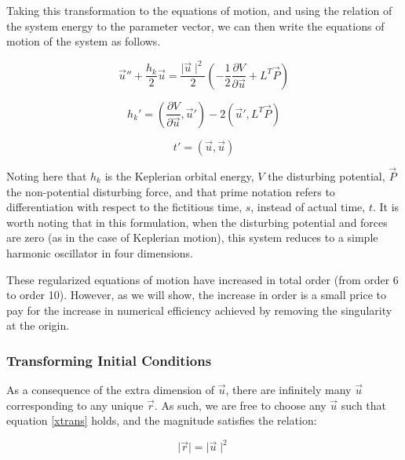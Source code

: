 \documentclass[11pt,twoside,letterpaper]{article}
\begin{document}
  Taking this transformation to the equations of motion, and using the
  relation of the system energy to the parameter vector, we can then
  write the equations of motion of the system as follows.

  \begin{equation} \label{eom}
    \vec{u}'' + \frac{h_k}{2}\vec{u} = \frac{\mid\vec{u}\mid^2}{2}
    \left(-\frac{1}{2}\frac{\partial{V}}{\partial{\vec{u}}} + L^T\vec{P}\right)
  \end{equation}

  \begin{equation} \label{energy_eom}
    h_k' = \left(\frac{\partial{V}}{\partial{\vec{u}}}, \vec{u}'\right)
    - 2\left(\vec{u}',L^T\vec{P}\right)
  \end{equation}

  \begin{equation} \label{time_eom}
    t' = \left(\vec{u}, \vec{u}\right)
  \end{equation}

  Noting here that \(h_k\) is the Keplerian orbital energy, \(V\) the
  disturbing potential, \(\vec{P}\) the non-potential disturbing
  force, and that prime notation refers to differentiation with
  respect to the fictitious time, \(s\), instead of actual time,
  \(t\). It is worth noting that in this formulation, when the
  disturbing potential and forces are zero (as in the case of
  Keplerian motion), this system reduces to a simple harmonic
  oscillator in four dimensions.

  These regularized equations of motion have increased in total order
  (from order 6 to order 10). However, as we will show, the increase
  in order is a small price to pay for the increase in numerical
  efficiency achieved by removing the singularity at the origin.

  \subsubsection{Transforming Initial Conditions}
  As a consequence of the extra dimension of \(\vec{u}\), there are
  infinitely many \(\vec{u}\) corresponding to any unique
  \(\vec{r}\). As such, we are free to choose any \(\vec{u}\) such
  that equation \ref{xtrans} holds, and the magnitude satisfies the
  relation:

  \begin{equation} \label{umag}
    \mid\vec{r}\mid = \mid\vec{u}\mid^2
  \end{equation}
\end{document}
